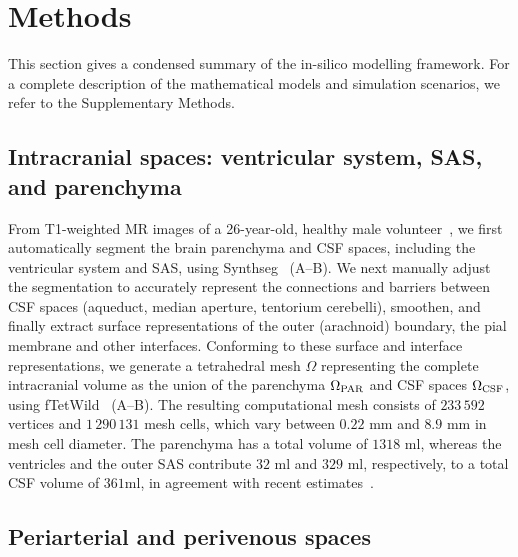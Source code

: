 \documentclass[fleqn,10pt]{wlscirep}
\begin{document}
\section*{Methods}

This section gives a condensed summary of the in-silico modelling
framework. For a complete description of the mathematical models and
simulation scenarios, we refer to the Supplementary Methods.

\subsection*{Intracranial spaces: ventricular system, SAS, and parenchyma}

From T1-weighted MR images of a 26-year-old, healthy male volunteer~\cite{hodneland2019new},
we first automatically segment the brain parenchyma and CSF spaces,
including the ventricular system and SAS, using
Synthseg~\cite{billot2023robust,billot2023synthseg}
(A--B). We next manually adjust the segmentation to
accurately represent the connections and barriers between CSF spaces (aqueduct,
median aperture, tentorium cerebelli), smoothen, and finally extract
surface representations of the outer (arachnoid) boundary, the pial
membrane and other interfaces. Conforming to these surface and
interface representations, we generate a tetrahedral mesh $\Omega$
representing the complete intracranial volume as the union of the
parenchyma $\Omega_{\rm PAR}$ and CSF spaces $\Omega_{\rm CSF}$, using
fTetWild~\cite{hu2020fast} (A--B). The resulting
computational mesh consists of $233\,592$ vertices and $1\,290\,131$
mesh cells, which vary between $0.22$ mm and $8.9$ mm in mesh cell
diameter. The parenchyma has a total volume of $1318$ ml, whereas the
ventricles and the outer SAS contribute $32$ ml and $329$ ml,
respectively, to a total CSF volume of $361$ml, in agreement with
recent estimates~\cite{hladky2024regulation}.

\subsection*{Periarterial and perivenous spaces}
\end{document}
